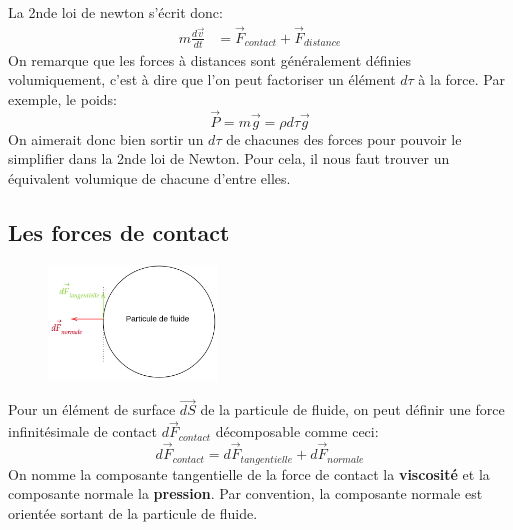 \documentclass[a4paper,10pt]{report}
\begin{document}
La 2nde loi de newton s'écrit donc:
\begin{align*}
m \frac{d\vec{v}}{dt} &= \vec{F}_{contact} + \vec{F}_{distance}
\end{align*}
 On remarque que les forces à distances sont généralement définies volumiquement, c'est à dire que l'on peut factoriser un élément $d\tau$ à la force. Par exemple, le poids:
 $$\vec{P} = m\vec{g} = \rho d\tau \vec{g}$$
 On aimerait donc bien sortir un $d\tau$ de chacunes des forces pour pouvoir le simplifier dans la 2nde loi de Newton. Pour cela, il nous faut trouver un équivalent volumique de chacune d'entre elles.

 \subsection{Les forces de contact}

\begin{figure}
 \includegraphics[width=0.4\textwidth]{force_de_contact_particule_de_fluide}
\end{figure}
Pour un élément de surface $\vec{dS}$ de la particule de fluide, on peut définir une force infinitésimale de contact $d\vec{F}_{contact}$ décomposable comme ceci:
$$d\vec{F}_{contact} = d\vec{F}_{tangentielle} + d\vec{F}_{normale}$$
On nomme la composante tangentielle de la force de contact la \textbf{viscosité} et la composante normale la \textbf{pression}. Par convention, la composante normale est orientée sortant de la particule de fluide.
\\
\\
\\
\newpage
\end{document}
